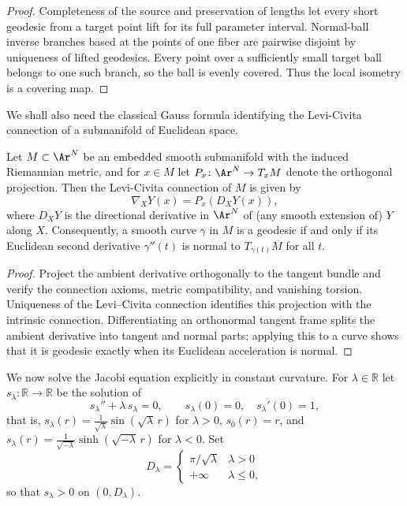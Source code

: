 \begin{proof}
\sketch
{}
Completeness of the source and preservation of lengths let every short geodesic from a target point lift for its full parameter interval. Normal-ball inverse branches based at the points of one fiber are pairwise disjoint by uniqueness of lifted geodesics. Every point over a sufficiently small target ball belongs to one such branch, so the ball is evenly covered. Thus the local isometry is a covering map.
\end{proof}

We shall also need the classical Gauss formula identifying the
Levi-Civita connection of a submanifold of Euclidean space.

\begin{lemma}
\label{lem:submanifold-connection}
\leanok

Let $M\subset\Ar^N$ be an embedded smooth submanifold with the
induced Riemannian metric, and for $x\in M$ let
$P_x\colon\Ar^N\to T_xM$ denote the orthogonal projection. Then
the Levi-Civita connection of $M$ is given by
$$\nabla_XY(x)=P_x\left(D_XY(x)\right),$$
where $D_XY$ is the directional derivative in $\Ar^N$ of (any
smooth extension of) $Y$ along $X$. Consequently, a smooth curve
$\gamma$ in $M$ is a geodesic if and only if its Euclidean second
derivative $\gamma''(t)$ is normal to $T_{\gamma(t)}M$ for all
$t$.
\end{lemma}

\begin{proof}
\sketch
{}
Project the ambient derivative orthogonally to the tangent bundle and verify the connection axioms, metric compatibility, and vanishing torsion. Uniqueness of the Levi--Civita connection identifies this projection with the intrinsic connection. Differentiating an orthonormal tangent frame splits the ambient derivative into tangent and normal parts; applying this to a curve shows that it is geodesic exactly when its Euclidean acceleration is normal.
\end{proof}

We now solve the Jacobi equation explicitly in constant curvature.
For $\lambda\in\mathbb{R}$ let $s_\lambda\colon
\mathbb{R}\to\mathbb{R}$ be the solution of
$$s_\lambda''+\lambda\, s_\lambda=0,\qquad s_\lambda(0)=0,\quad
s_\lambda'(0)=1,$$
that is, $s_\lambda(r)=\frac{1}{\sqrt\lambda}\sin(\sqrt\lambda\,r)$
for $\lambda>0$, $s_0(r)=r$, and
$s_\lambda(r)=\frac{1}{\sqrt{-\lambda}}\sinh(\sqrt{-\lambda}\,r)$
for $\lambda<0$. Set
$$D_\lambda=\begin{cases}\pi/\sqrt{\lambda}&\lambda>0\\
+\infty&\lambda\le 0,\end{cases}$$
so that $s_\lambda>0$ on $(0,D_\lambda)$.

